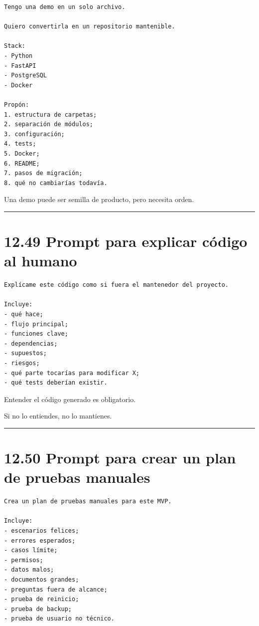 \begin{lstlisting}
Tengo una demo en un solo archivo.

Quiero convertirla en un repositorio mantenible.

Stack:
- Python
- FastAPI
- PostgreSQL
- Docker

Propón:
1. estructura de carpetas;
2. separación de módulos;
3. configuración;
4. tests;
5. Docker;
6. README;
7. pasos de migración;
8. qué no cambiarías todavía.
\end{lstlisting}

Una demo puede ser semilla de producto, pero necesita orden.

\begin{center}\rule{0.5\linewidth}{0.5pt}\end{center}

\section{12.49 Prompt para explicar código al
humano}\label{prompt-para-explicar-cuxf3digo-al-humano}

\begin{lstlisting}
Explícame este código como si fuera el mantenedor del proyecto.

Incluye:
- qué hace;
- flujo principal;
- funciones clave;
- dependencias;
- supuestos;
- riesgos;
- qué parte tocarías para modificar X;
- qué tests deberían existir.
\end{lstlisting}

Entender el código generado es obligatorio.

Si no lo entiendes, no lo mantienes.

\begin{center}\rule{0.5\linewidth}{0.5pt}\end{center}

\section{12.50 Prompt para crear un plan de pruebas
manuales}\label{prompt-para-crear-un-plan-de-pruebas-manuales}

\begin{lstlisting}
Crea un plan de pruebas manuales para este MVP.

Incluye:
- escenarios felices;
- errores esperados;
- casos límite;
- permisos;
- datos malos;
- documentos grandes;
- preguntas fuera de alcance;
- prueba de reinicio;
- prueba de backup;
- prueba de usuario no técnico.
\end{lstlisting}

